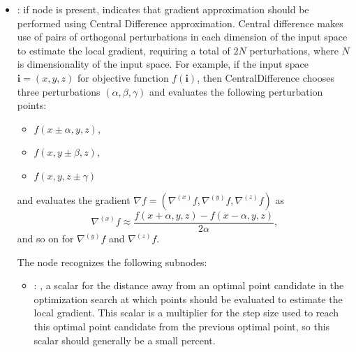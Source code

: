 \begin{itemize}
\begin{itemize}
        \item {}:
          if node is present, indicates that gradient approximation should be performed
          using Central Difference approximation. Central difference makes use of pairs of
          orthogonal perturbations         in each dimension of the input space to estimate the
          local gradient, requiring a total of $2N$         perturbations, where $N$ is
          dimensionality of the input space. For example, if the input space         $\mathbf{i} =
          (x, y, z)$ for objective function $f(\mathbf{i})$, then CentralDifference chooses
          three perturbations $(\alpha, \beta, \gamma)$ and evaluates the following perturbation
          points:         \begin{itemize}           \item $f(x\pm\alpha, y, z)$,           \item
          $f(x, y\pm\beta, z)$,           \item $f(x, y, z\pm\gamma)$         \end{itemize}
          and evaluates the gradient $\nabla f = (\nabla^{(x)} f, \nabla^{(y)} f, \nabla^{(z)} f)$
          as         \begin{equation*}           \nabla^{(x)}f \approx \frac{f(x+\alpha, y, z) -
          f(x-\alpha, y, z)}{2\alpha},         \end{equation*}         and so on for $
          \nabla^{(y)}f$ and $\nabla^{(z)}f$.

          The  node recognizes the following subnodes:
          \begin{itemize}
            \item {}: ,
              a scalar for the distance away from an optimal point candidate in the optimization
              search at which points should be evaluated to estimate the local gradient. This scalar
              is a         multiplier for the step size used to reach this optimal point candidate
              from the previous         optimal point, so this scalar should generally be a small
              percent. 
          \end{itemize}


\end{itemize}
\end{itemize}

